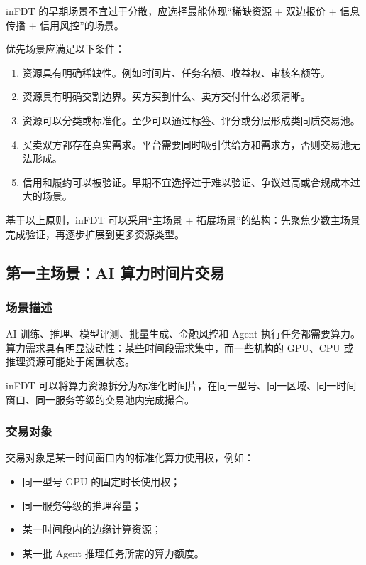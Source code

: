 \documentclass[UTF8,a4paper,12pt]{ctexart}
\begin{document}
inFDT 的早期场景不宜过于分散，应选择最能体现“稀缺资源 + 双边报价 + 信息传播 + 信用风控”的场景。

优先场景应满足以下条件：

\begin{enumerate}
    \item 资源具有明确稀缺性。例如时间片、任务名额、收益权、审核名额等。
    \item 资源具有明确交割边界。买方买到什么、卖方交付什么必须清晰。
    \item 资源可以分类或标准化。至少可以通过标签、评分或分层形成类同质交易池。
    \item 买卖双方都存在真实需求。平台需要同时吸引供给方和需求方，否则交易池无法形成。
    \item 信用和履约可以被验证。早期不宜选择过于难以验证、争议过高或合规成本过大的场景。
\end{enumerate}

基于以上原则，inFDT 可以采用“主场景 + 拓展场景”的结构：先聚焦少数主场景完成验证，再逐步扩展到更多资源类型。

\subsection{第一主场景：AI 算力时间片交易}

\subsubsection*{场景描述}

AI 训练、推理、模型评测、批量生成、金融风控和 Agent 执行任务都需要算力。算力需求具有明显波动性：某些时间段需求集中，而一些机构的 GPU、CPU 或推理资源可能处于闲置状态。

inFDT 可以将算力资源拆分为标准化时间片，在同一型号、同一区域、同一时间窗口、同一服务等级的交易池内完成撮合。

\subsubsection*{交易对象}

交易对象是某一时间窗口内的标准化算力使用权，例如：

\begin{itemize}
    \item 同一型号 GPU 的固定时长使用权；
    \item 同一服务等级的推理容量；
    \item 某一时间段内的边缘计算资源；
    \item 某一批 Agent 推理任务所需的算力额度。
\end{itemize}
\end{document}

